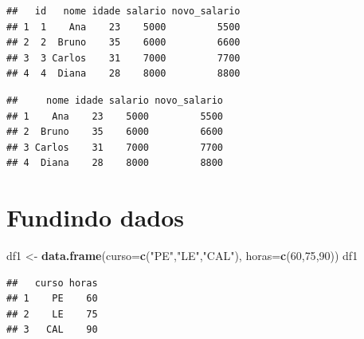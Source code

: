 \documentclass[
]{book}
\newenvironment{Shaded}{\begin{snugshade}}{\end{snugshade}}
\newcommand{\AttributeTok}[1]{\textcolor[rgb]{0.13,0.29,0.53}{#1}}
\newcommand{\CommentTok}[1]{\textcolor[rgb]{0.56,0.35,0.01}{\textit{#1}}}
\newcommand{\ConstantTok}[1]{\textcolor[rgb]{0.56,0.35,0.01}{#1}}
\newcommand{\DecValTok}[1]{\textcolor[rgb]{0.00,0.00,0.81}{#1}}
\newcommand{\FloatTok}[1]{\textcolor[rgb]{0.00,0.00,0.81}{#1}}
\newcommand{\FunctionTok}[1]{\textcolor[rgb]{0.13,0.29,0.53}{\textbf{#1}}}
\newcommand{\NormalTok}[1]{#1}
\newcommand{\OtherTok}[1]{\textcolor[rgb]{0.56,0.35,0.01}{#1}}
\newcommand{\SpecialCharTok}[1]{\textcolor[rgb]{0.81,0.36,0.00}{\textbf{#1}}}
\newcommand{\StringTok}[1]{\textcolor[rgb]{0.31,0.60,0.02}{#1}}
\theoremstyle{definition}
\theoremstyle{definition}
\theoremstyle{definition}
\theoremstyle{definition}
\theoremstyle{remark}
\begin{document}
\begin{Shaded}
\end{Shaded}

\begin{verbatim}
##   id   nome idade salario novo_salario
## 1  1    Ana    23    5000         5500
## 2  2  Bruno    35    6000         6600
## 3  3 Carlos    31    7000         7700
## 4  4  Diana    28    8000         8800
\end{verbatim}

\begin{Shaded}
\end{Shaded}

\begin{verbatim}
##     nome idade salario novo_salario
## 1    Ana    23    5000         5500
## 2  Bruno    35    6000         6600
## 3 Carlos    31    7000         7700
## 4  Diana    28    8000         8800
\end{verbatim}

\section{Fundindo dados}\label{fundindo-dados}

\begin{Shaded}
\begin{Highlighting}[]
\NormalTok{df1 }\OtherTok{\textless{}{-}} \FunctionTok{data.frame}\NormalTok{(}\AttributeTok{curso=}\FunctionTok{c}\NormalTok{(}\StringTok{"PE"}\NormalTok{,}\StringTok{"LE"}\NormalTok{,}\StringTok{"CAL"}\NormalTok{), }\AttributeTok{horas=}\FunctionTok{c}\NormalTok{(}\DecValTok{60}\NormalTok{,}\DecValTok{75}\NormalTok{,}\DecValTok{90}\NormalTok{))}
\NormalTok{df1}
\end{Highlighting}
\end{Shaded}

\begin{verbatim}
##   curso horas
## 1    PE    60
## 2    LE    75
## 3   CAL    90
\end{verbatim}
\end{document}
